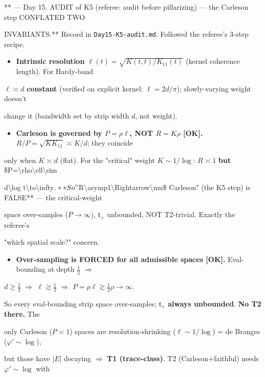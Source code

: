 \documentclass[10pt]{article}
\begin{document}
** --- Day 15. AUDIT of K5 (referee: audit before pillarizing) --- the Carleson step CONFLATED TWO\par
INVARIANTS.** Record in \texttt{Day15-K5-audit.md}. Followed the referee's 3-step recipe.\par
\begin{itemize}
\item \textbf{Intrinsic resolution $\ell(t)=\sqrt{K(t,t)/K_{11}(t)}$} (kernel coherence length). For Hardy-band
\end{itemize}
  $\ell\asymp d$ \textbf{constant} (verified on explicit kernel: $\ell=2d/\pi$); slowly-varying weight doesn't\par
  change it (bandwidth set by strip width $d$, not weight).\par
\begin{itemize}
\item \textbf{Carleson is governed by $P=\rho\ell$, NOT $R=K\rho$ [OK].} $R/P=\sqrt{KK_{11}}\asymp K/d$; they coincide
\end{itemize}
  only when $K\asymp d$ (flat). For the "critical" weight $K\sim1/\log$: $R\asymp1$ \textbf{but} \$P=\textbackslash{}rho\textbackslash{}ell\textbackslash{}sim\par
  d\textbackslash{}log t\textbackslash{}to\textbackslash{}infty$. **So "$R\textbackslash{}asymp1\textbackslash{}Rightarrow\textbackslash{}mu\$ Carleson" (the K5 step) is FALSE** --- the critical-weight\par
  space over-samples ($P\to\infty$), $\mathfrak t_+$ unbounded, NOT T2-trivial. Exactly the referee's\par
  "which spatial scale?" concern.\par
\begin{itemize}
\item \textbf{Over-sampling is FORCED for all admissible spaces [OK].} Eval-bounding at depth $\tfrac12$ $\Rightarrow$
\end{itemize}
  $d\ge\tfrac12$ $\Rightarrow$ $\ell\gtrsim\tfrac12$ $\Rightarrow$ $P=\rho\ell\gtrsim\tfrac12\rho\to\infty$.\par
  So every eval-bounding strip space over-samples; $\mathfrak t_+$ \textbf{always unbounded}. \textbf{No T2 there.} The\par
  only Carleson ($P\asymp1$) spaces are resolution-shrinking ($\ell\sim1/\log$) = de Branges ($\varphi'\sim\log$),\par
  but those have $|E|$ decaying \ensuremath{\Rightarrow} \textbf{T1 (trace-class)}. T2 (Carleson+faithful) needs $\varphi'\sim\log$ with\par
\end{document}
